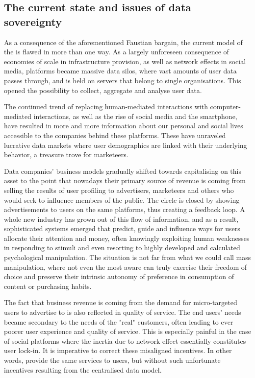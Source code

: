 \subsection{The current state and issues of data sovereignty \statusgreen }\label{sec:data-sovereignty}

As a consequence of the aforementioned Faustian bargain, the current model of the  is flawed in more than one way. As a largely unforeseen consequence of economies of scale in infrastructure provision, as well as network effects in social media, platforms became massive data silos, where vast amounts of user data passes through, and is held on servers that belong to single organisations. This opened the possibility to collect, aggregate and analyse user data. 

The continued trend of replacing human-mediated interactions with computer-mediated interactions, as well as the rise of social media and the smartphone, have resulted in more and more information about our personal and social lives accessible to the companies behind these platforms. These have unraveled lucrative data markets where user demographics are linked with their underlying behavior, a treasure trove for marketeers.

Data companies' business models gradually shifted towards capitalising on this asset to the point that nowadays their primary source of revenue is coming from selling the results of user profiling to advertisers, marketeers and others who would seek to influence members of the public. The circle is closed by showing advertisements to users on the same platforms, thus creating a feedback loop. A whole new industry has grown out of this flow of information, and as a result, sophisticated systems emerged that predict, guide and influence ways for users allocate their attention and money, often knowingly exploiting human weaknesses in responding to stimuli and even resorting to highly developed and calculated psychological manipulation. The situation is not far from what we could call mass manipulation, where not even the most aware can truly exercise their freedom of choice and preserve their intrinsic autonomy of preference in consumption of content or purchasing habits.

The fact that business revenue is coming from the demand for micro-targeted users to advertise to is also reflected in quality of service. The end users' needs became secondary to the needs of the "real" customers, often leading to ever poorer user experience and quality of service. This is especially painful in the case of social platforms where the inertia due to network effect essentially constitutes user lock-in. It is imperative to correct these misaligned incentives. In other words, provide the same services to users, but without such unfortunate incentives resulting from the centralised data model.

